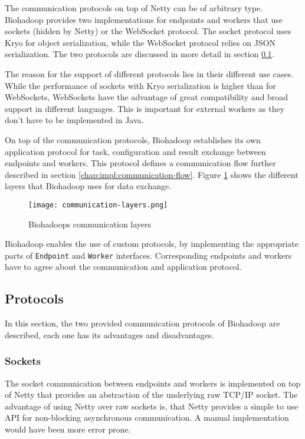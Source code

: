 The communication protocols on top of Netty can be of arbitrary type. Biohadoop provides two implementations for endpoints and workers that use sockets (hidden by Netty) or the WebSocket protocol. The socket protocol uses Kryo \cite{kryo} for object serialization, while the WebSocket protocol relies on JSON serialization. The two protocols are discussed in more detail in section \ref{chap:impl:protocols}.

The reason for the support of different protocols lies in their different use cases. While the performance of sockets with Kryo serialization is higher than for WebSockets, WebSockets have the advantage of great compatibility and broad support in different languages. This is important for external workers as they don't have to be implemented in Java.

On top of the communication protocols, Biohadoop establishes its own application protocol for task, configuration and result exchange between endpoints and workers. This protocol defines a communication flow further described in section \ref{chap:impl:communication-flow}. Figure \ref{fig:communication-layers} shows the different layers that Biohadoop uses for data exchange.

\begin{figure}[ht!]
  \centering
  \texttt{[image: communication-layers.png]}
  \caption{Biohadoops communication layers}
  \label{fig:communication-layers}
\end{figure}

Biohadoop enables the use of custom protocols, by implementing the appropriate parts of \texttt{Endpoint} and \texttt{Worker} interfaces. Corresponding endpoints and workers have to agree about the communication and application protocol.

\subsection{Protocols}
\label{chap:impl:protocols}
In this section, the two provided communication protocols of Biohadoop are described, each one has its advantages and disadvantages.

\subsubsection{Sockets}
The socket communication between endpoints and workers is implemented on top of Netty that provides an abstraction of the underlying raw TCP/IP socket. The advantage of using Netty over raw sockets is, that Netty provides a simple to use API for non-blocking asynchronous communication. A manual implementation would have been more error prone.

